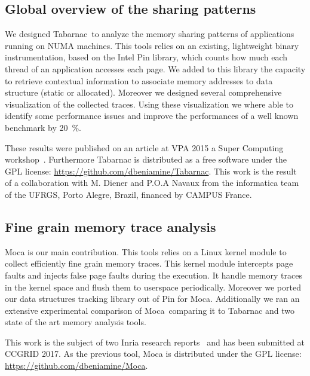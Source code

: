 \subsection{Global overview of the sharing patterns}

We designed \gls{Tabarnac} to analyze the memory sharing patterns of applications running on \gls{NUMA} machines.
This tools relies on an existing, lightweight binary instrumentation, based on the \gls{Intel} \gls{Pin} library, which counts how much each thread of an application accesses each page.
We added to this library the capacity to retrieve contextual information to associate memory addresses to data structure (static or allocated).
Moreover we designed several comprehensive visualization of the collected traces.
Using these visualization we where able to identify some performance issues and improve the performances of a well known benchmark by \SI{20}{\%}.

These results were published on an article at \gls{VPA} 2015 a Super Computing workshop~\cite{Beniamine15TABARNAC}.
Furthermore \gls{Tabarnac} is distributed as a free software under the \gls{GPL} license: \url{https://github.com/dbeniamine/Tabarnac}.
This work is the result of a collaboration with M. Diener and P.O.A Navaux from the informatica team of the \gls{UFRGS}, Porto Alegre, Brazil, financed by CAMPUS France.

\subsection{Fine grain memory trace analysis}

\gls{Moca} is our main contribution.
This tools relies on a \gls{Linux} kernel module to collect efficiently fine grain memory traces.
This kernel module intercepts page faults and injects false page faults during the execution.
It handle memory traces in the kernel space and flush them to userspace periodically.
Moreover we ported our data structures tracking library out of \gls{Pin} for \gls{Moca}.
Additionally we ran an extensive experimental comparison of \gls{Moca} comparing it to \gls{Tabarnac} and two state of the art memory analysis tools.

This work is the subject of two Inria research reports~\cite{Beniamine15Memory,Beniamine16Moca} and has been submitted at \gls{CCGRID} 2017.
As the previous tool, \gls{Moca} is distributed under the \gls{GPL} license:\\
\url{https://github.com/dbeniamine/Moca}.


